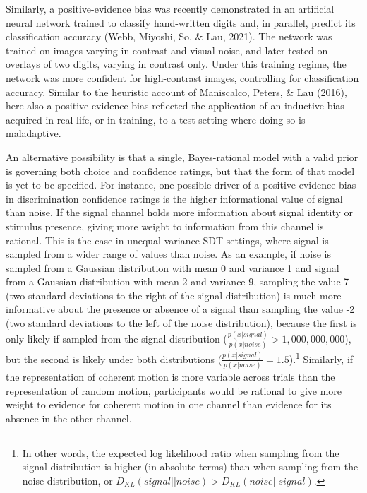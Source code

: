 \documentclass[12pt,twoside]{reedthesis}
\begin{document}
Similarly, a positive-evidence bias was recently demonstrated in an artificial neural network trained to classify hand-written digits and, in parallel, predict its classification accuracy (Webb, Miyoshi, So, \& Lau, 2021). The network was trained on images varying in contrast and visual noise, and later tested on overlays of two digits, varying in contrast only. Under this training regime, the network was more confident for high-contrast images, controlling for classification accuracy. Similar to the heuristic account of Maniscalco, Peters, \& Lau (2016), here also a positive evidence bias reflected the application of an inductive bias acquired in real life, or in training, to a test setting where doing so is maladaptive.

An alternative possibility is that a single, Bayes-rational model with a valid prior is governing both choice and confidence ratings, but that the form of that model is yet to be specified. For instance, one possible driver of a positive evidence bias in discrimination confidence ratings is the higher informational value of signal than noise. If the signal channel holds more information about signal identity or stimulus presence, giving more weight to information from this channel is rational. This is the case in unequal-variance SDT settings, where signal is sampled from a wider range of values than noise. As an example, if noise is sampled from a Gaussian distribution with mean 0 and variance 1 and signal from a Gaussian distribution with mean 2 and variance 9, sampling the value 7 (two standard deviations to the right of the signal distribution) is much more informative about the presence or absence of a signal than sampling the value -2 (two standard deviations to the left of the noise distribution), because the first is only likely if sampled from the signal distribution (\(\frac{p(x|signal)}{p(x|noise)}>1,000,000,000\)), but the second is likely under both distributions (\(\frac{p(x|signal)}{p(x|noise)}=1.5\)).\footnote{In other words, the expected log likelihood ratio when sampling from the signal distribution is higher (in absolute terms) than when sampling from the noise distribution, or \(D_{KL}(signal||noise)>D_{KL}(noise||signal)\).} Similarly, if the representation of coherent motion is more variable across trials than the representation of random motion, participants would be rational to give more weight to evidence for coherent motion in one channel than evidence for its absence in the other channel.
\end{document}
